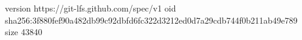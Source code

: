 version https://git-lfs.github.com/spec/v1
oid sha256:3f880fef90a482db99c92dbfd6fc322d3212ed0d7a29cdb744f0b211ab49e789
size 43840
